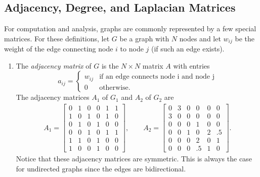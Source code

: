 \subsection*{Adjacency, Degree, and Laplacian Matrices} %

For computation and analysis, graphs are commonly represented by a few special matrices.
For these definitions, let $G$ be a graph with $N$ nodes and let $w_{ij}$ be the weight of the edge connecting node $i$ to node $j$ (if such an edge exists).
%
\begin{enumerate}
\item The \emph{adjacency matrix} of $G$ is the $N\times N$ matrix $A$ with entries
\[
a_{ij} =
\begin{cases}
w_{ij} & \text{if an edge connects node i and node j} \\
0 & \text{otherwise.}
\end{cases}
\]
The adjacency matrices $A_1$ of $G_1$ and $A_2$ of $G_2$ are
\begin{align*}
A_1 = \left[\begin{array}{cccccc}
0 & 1 & 0 & 0 & 1 & 1\\
1 & 0 & 1 & 0 & 1 & 0\\
0 & 1 & 0 & 1 & 0 & 0\\
0 & 0 & 1 & 0 & 1 & 1\\
1 & 1 & 0 & 1 & 0 & 0\\
1 & 0 & 0 & 1 & 0 & 0
\end{array}\right],
\qquad A_2 =
\left[\begin{array}{cccccc}
0 & 3 & 0 & 0 & 0 & 0\\
3 & 0 & 0 & 0 & 0 & 0\\
0 & 0 & 0 & 1 & 0 & 0\\
0 & 0 & 1 & 0 & 2 & .5\\
0 & 0 & 0 & 2 & 0 & 1\\
0 & 0 & 0 & .5 & 1 & 0
\end{array}\right].
\end{align*}
Notice that these adjacency matrices are symmetric.
This is always the case for undirected graphs since the edges are bidirectional.

\begin{comment} %
Raising the adjacency matrix to a power yields some very interesting information.
We can discover the number of paths of length $n$ between two nodes by raising a graph's adjacency matrix to the $n$th power.
For example, by squaring $A$, we can find the number of paths of length two between every pair of nodes.
\begin{lstlisting}
>>> A = np.array([[0,1,0,0,1,0],[1,0,1,0,1,0],
                  [0,1,0,1,0,0],[0,0,1,0,1,1],
                  [1,1,0,1,0,0],[0,0,0,1,0,0]])


\end{comment}
\end{enumerate}
